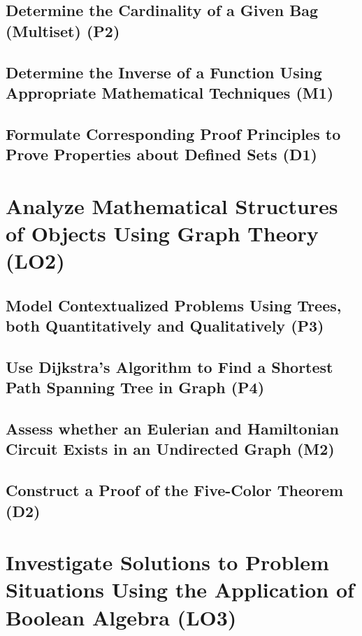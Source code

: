 \documentclass[12pt, a4paper, twoside]{report} %
\begin{document}
\section{Determine the Cardinality of a Given Bag (Multiset) (P2)}
\label{sec:P2}


\section{Determine the Inverse of a Function Using Appropriate Mathematical Techniques (M1)}

\label{sec:M1}



\section{Formulate Corresponding Proof Principles to Prove Properties about Defined Sets (D1)}

\label{sec:D1}

\chapter{Analyze Mathematical Structures of Objects Using Graph Theory (LO2)}
\label{chap:LO2}

\section{Model Contextualized Problems Using Trees, both Quantitatively and Qualitatively (P3)}
\label{sec:P3}


\section{Use Dijkstra’s Algorithm to Find a Shortest Path Spanning Tree in Graph (P4)}
\label{sec:P4}

\section{Assess whether an Eulerian and Hamiltonian Circuit Exists in an Undirected Graph (M2)}
\label{sec:M2}

\section{Construct a Proof of the Five-Color Theorem (D2)}
\label{sec:D2}

\chapter{Investigate Solutions to Problem Situations Using the Application of Boolean Algebra (LO3)}
\label{chap:LO3}
\end{document}
